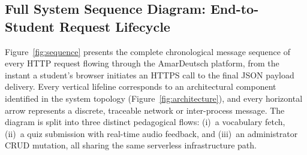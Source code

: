 \documentclass[12pt,a4paper]{article}
\begin{document}
\subsection{Full System Sequence Diagram: End-to-Student Request Lifecycle}
Figure~\ref{fig:sequence} presents the complete chronological message sequence of every HTTP request flowing through the AmarDeutsch platform, from the instant a student's browser initiates an HTTPS call to the final JSON payload delivery. Every vertical lifeline corresponds to an architectural component identified in the system topology (Figure~\ref{fig:architecture}), and every horizontal arrow represents a discrete, traceable network or inter-process message. The diagram is split into three distinct pedagogical flows: (i)~a vocabulary fetch, (ii)~a quiz submission with real-time audio feedback, and (iii)~an administrator CRUD mutation, all sharing the same serverless infrastructure path.
\end{document}
